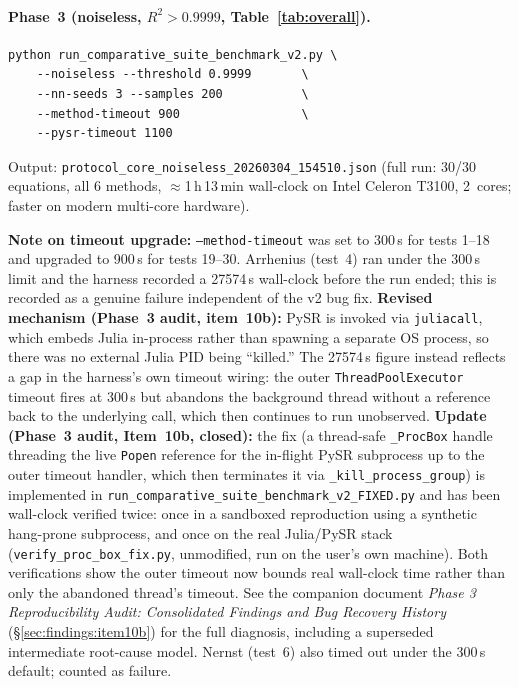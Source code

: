 \documentclass[twoside,11pt]{article}
\begin{document}
\paragraph{Phase~3 (noiseless, $R^2>0.9999$, Table~\ref{tab:overall}).}
\begin{verbatim}
python run_comparative_suite_benchmark_v2.py \
    --noiseless --threshold 0.9999       \
    --nn-seeds 3 --samples 200           \
    --method-timeout 900                 \
    --pysr-timeout 1100
\end{verbatim}
Output: \texttt{protocol\_core\_noiseless\_20260304\_154510.json}
(full run: 30/30 equations, all 6 methods, $\approx$1\,h\,13\,min wall-clock
on Intel Celeron T3100, 2~cores; faster on modern multi-core hardware).

\textbf{Note on timeout upgrade:} \texttt{--method-timeout} was set to 300\,s
for tests 1--18 and upgraded to 900\,s for tests 19--30. Arrhenius (test~4)
ran under the 300\,s limit and the harness recorded a 27574\,s wall-clock
before the run ended; this is recorded as a genuine failure independent of
the v2 bug fix. \textbf{Revised mechanism (Phase~3 audit, item~10b):} PySR is
invoked via \texttt{juliacall}, which embeds Julia in-process rather than
spawning a separate OS process, so there was no external Julia PID being
``killed.'' The 27574\,s figure instead reflects a gap in the harness's own
timeout wiring: the outer \texttt{ThreadPoolExecutor} timeout fires at
300\,s but abandons the background thread without a reference back to the
underlying call, which then continues to run unobserved. \textbf{Update
(Phase~3 audit, Item~10b, closed):} the fix (a thread-safe \texttt{\_ProcBox}
handle threading the live \texttt{Popen} reference for the in-flight PySR
subprocess up to the outer timeout handler, which then terminates it via
\texttt{\_kill\_process\_group}) is implemented in
\texttt{run\_comparative\_suite\_benchmark\_v2\_FIXED.py} and has been
wall-clock verified twice: once in a sandboxed reproduction using a
synthetic hang-prone subprocess, and once on the real Julia/PySR stack
(\texttt{verify\_proc\_box\_fix.py}, unmodified, run on the user's own
machine). Both verifications show the outer timeout now bounds real
wall-clock time rather than only the abandoned thread's timeout. See the
companion document \emph{Phase 3 Reproducibility Audit: Consolidated
Findings and Bug Recovery History} (\S\ref{sec:findings:item10b}) for the
full diagnosis, including a superseded intermediate root-cause model.
Nernst (test~6) also timed out under the 300\,s default; counted as failure.
\end{document}
